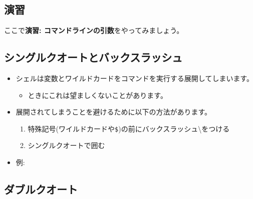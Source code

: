 \documentclass{jsarticle}
\begin{document}
\subsection*{演習}

ここで{\bf 演習: コマンドラインの引数}をやってみましょう。


\subsection{シングルクオートとバックスラッシュ}


\begin{itemize}
\item シェルは変数とワイルドカードをコマンドを実行する{\color{red}{\bf 前に}}展開してしまいます。

	\begin{itemize}
	\item ときにこれは望ましくないことがあります。
	\end{itemize}

\item 展開されてしまうことを避けるために以下の方法があります。

	\begin{enumerate}
	\item 特殊記号(ワイルドカードや{\tt \$})の前にバックスラッシュ\textbackslash{}をつける
	\item シングルクオート{\color{red}}で囲む
	\end{enumerate}

\item 例:

{}

\end{itemize}


\subsection{ダブルクオート}
\end{document}
